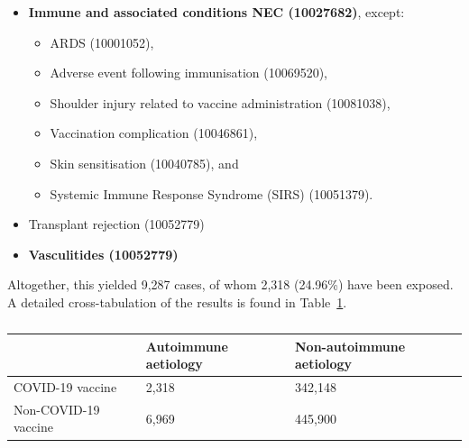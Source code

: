 \documentclass{article}
\begin{document}
\begin{itemize}
\begin{itemize}
\begin{itemize}
                                                        \item \textbf{Immune and associated conditions NEC (10027682)}, except: \begin{itemize}
                                                                                                                                    \item ARDS (10001052),
                                                                                                                                    \item Adverse event following immunisation (10069520),
                                                                                                                                    \item Shoulder injury related to vaccine administration (10081038),
                                                                                                                                    \item Vaccination complication (10046861),
                                                                                                                                    \item Skin sensitisation (10040785), and
                                                                                                                                    \item Systemic Immune Response Syndrome (SIRS) (10051379).
                                                        \end{itemize}
                                                        \item Transplant rejection (10052779)
                                                        \item \textbf{Vasculitides (10052779)}
              \end{itemize}
    \end{itemize}
\end{itemize}

Altogether, this yielded 9,287 cases, of whom 2,318 (24.96\%) have been exposed. A detailed cross-tabulation of the results is found in Table~\ref{tab:categories_crosstab}.

\begin{table}[]
\centering
\begin{tabular}{@{}lll@{}}
\toprule
                     & Autoimmune aetiology & Non-autoimmune aetiology \\ \midrule
COVID-19 vaccine     & 2,318                & 342,148                  \\
Non-COVID-19 vaccine & 6,969                & 445,900                  \\ \bottomrule
\end{tabular}
\caption{}
\label{tab:categories_crosstab}
\end{table}
\end{document}

